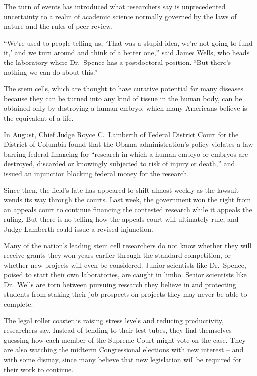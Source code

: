 ﻿\documentclass[12pt]{article}
\begin{document}
The turn of events has introduced what researchers say is unprecedented uncertainty to a realm of
academic science normally governed by the laws of nature and the rules of peer review.

``We're used to people telling us, `That was a stupid idea, we're not going to fund it,' and we turn
around and think of a better one,'' said James Wells, who heads the laboratory where Dr.~Spence has
a postdoctoral position. ``But there's nothing we can do about this.''

The stem cells, which are thought to have curative potential for many diseases because they can be
turned into any kind of tissue in the human body, can be obtained only by destroying a human embryo,
which many Americans believe is the equivalent of a life.

In August, Chief Judge Royce C.~Lamberth of Federal District Court for the District of Columbia
found that the Obama administration's policy violates a law barring federal financing for ``research
in which a human embryo or embryos are destroyed, discarded or knowingly subjected to risk of injury
or death,'' and issued an injunction blocking federal money for the research.

Since then, the field's fate has appeared to shift almost weekly as the lawsuit wends its way
through the courts. Last week, the government won the right from an appeals court to continue
financing the contested research while it appeals the ruling. But there is no telling how the
appeals court will ultimately rule, and Judge Lamberth could issue a revised injunction.

Many of the nation's leading stem cell researchers do not know whether they will receive grants they
won years earlier through the standard competition, or whether new projects will even be considered.
Junior scientists like Dr.~Spence, poised to start their own laboratories, are caught in limbo.
Senior scientists like Dr.~Wells are torn between pursuing research they believe in and protecting
students from staking their job prospects on projects they may never be able to complete.

The legal roller coaster is raising stress levels and reducing productivity, researchers say.
Instead of tending to their test tubes, they find themselves guessing how each member of the Supreme
Court might vote on the case. They are also watching the midterm Congressional elections with new
interest -- and with some dismay, since many believe that new legislation will be required for their
work to continue.
\end{document}
